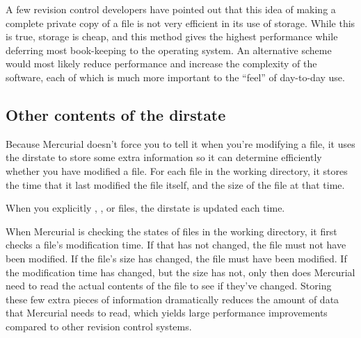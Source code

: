 A few revision control developers have pointed out that this idea of
making a complete private copy of a file is not very efficient in its
use of storage.  While this is true, storage is cheap, and this method
gives the highest performance while deferring most book-keeping to the
operating system.  An alternative scheme would most likely reduce
performance and increase the complexity of the software, each of which
is much more important to the ``feel'' of day-to-day use.

\subsection{Other contents of the dirstate}

Because Mercurial doesn't force you to tell it when you're modifying a
file, it uses the dirstate to store some extra information so it can
determine efficiently whether you have modified a file.  For each file
in the working directory, it stores the time that it last modified the
file itself, and the size of the file at that time.  

When you explicitly , ,  or
 files, the dirstate is updated each time.

When Mercurial is checking the states of files in the working
directory, it first checks a file's modification time.  If that has
not changed, the file must not have been modified.  If the file's size
has changed, the file must have been modified.  If the modification
time has changed, but the size has not, only then does Mercurial need
to read the actual contents of the file to see if they've changed.
Storing these few extra pieces of information dramatically reduces the
amount of data that Mercurial needs to read, which yields large
performance improvements compared to other revision control systems.

